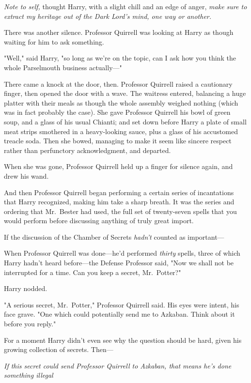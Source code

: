 \emph{Note to self,} thought Harry, with a slight chill and an edge of anger,
\emph{make sure to extract my heritage out of the Dark Lord's mind, one way or
another.}

There was another silence. Professor Quirrell was looking at Harry as though
waiting for him to ask something.

"Well," said Harry, "so long as we're on the topic, can I ask how you think the
whole Parselmouth business actually—"

There came a knock at the door, then. Professor Quirrell raised a cautionary
finger, then opened the door with a wave. The waitress entered, balancing a
huge platter with their meals as though the whole assembly weighed nothing
(which was in fact probably the case). She gave Professor Quirrell his bowl of
green soup, and a glass of his usual Chianti; and set down before Harry a plate
of small meat strips smothered in a heavy-looking sauce, plus a glass of his
accustomed treacle soda. Then she bowed, managing to make it seem like sincere
respect rather than perfunctory acknowledgment, and departed.

When she was gone, Professor Quirrell held up a finger for silence again, and
drew his wand.

And then Professor Quirrell began performing a certain series of incantations
that Harry recognized, making him take a sharp breath. It was the series and
ordering that Mr.~Bester had used, the full set of twenty-seven spells that you
would perform before discussing anything of truly great import.

If the discussion of the Chamber of Secrets \emph{hadn't} counted as
important—

When Professor Quirrell was done—he'd performed \emph{thirty} spells, three
of which Harry hadn't heard before—the Defense Professor said, "Now we shall
not be interrupted for a time. Can you keep a secret, Mr.~Potter?"

Harry nodded.

"A serious secret, Mr.~Potter," Professor Quirrell said. His eyes were intent,
his face grave. "One which could potentially send me to Azkaban. Think about it
before you reply."

For a moment Harry didn't even see why the question should be hard, given his
growing collection of secrets. Then—

\emph{If this secret could send Professor Quirrell to Azkaban, that means he's
done something illegal{\el}}

